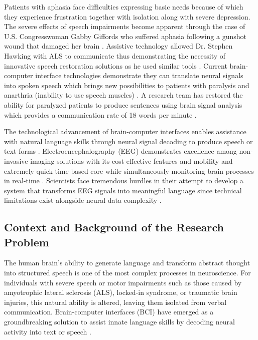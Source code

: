 \documentclass[journal]{IEEEtran}
\begin{document}
Patients with aphasia face difficulties expressing basic needs because of which they experience frustration together with isolation along with severe depression. The severe effects of speech impairments become apparent through the case of U.S. Congresswoman Gabby Giffords who suffered aphasia following a gunshot wound that damaged her brain \cite{unknown-author-2022B}. Assistive technology allowed Dr. Stephen Hawking with ALS to communicate thus demonstrating the necessity of innovative speech restoration solutions as he used similar tools \cite{servick-2021}. Current brain-computer interface technologies demonstrate they can translate neural signals into spoken speech which brings new possibilities to patients with paralysis and anarthria (inability to use speech muscles) \cite{servick-2021}. A research team has restored the ability for paralyzed patients to produce sentences using brain signal analysis which provides a communication rate of 18 words per minute \cite{servick-2021}.

The technological advancement of brain-computer interfaces enables assistance with natural language skills through neural signal decoding to produce speech or text forms \cite{Moses2021, Willett2023}. Electroencephalography (EEG) demonstrates excellence among non-invasive imaging solutions with its cost-effective features and mobility and extremely quick time-based core while simultaneously monitoring brain processes in real-time \cite{Hollenstein2018, Panachakel2021}. Scientists face tremendous hurdles in their attempt to develop a system that transforms EEG signals into meaningful language since technical limitations exist alongside neural data complexity \cite{Duan2023, Feng2023}.

\subsection{Context and Background of the Research Problem}
The human brain's ability to generate language and transform abstract thought into structured speech is one of the most complex processes in neuroscience. For individuals with severe speech or motor impairments such as those caused by amyotrophic lateral sclerosis (ALS), locked-in syndrome, or traumatic brain injuries, this natural ability is altered, leaving them isolated from verbal communication. Brain-computer interfaces (BCI) have emerged as a groundbreaking solution to assist innate language skills by decoding neural activity into text or speech \cite{Moses2021, Willett2023}.
\end{document}
